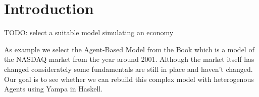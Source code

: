 \section{Introduction}

TODO: select a suitable model simulating an economy 

As example we select the Agent-Based Model from the Book \cite{darley_nasdaq_2007} which is a model of the NASDAQ market from the year around 2001. Although the market itself has changed considerately some fundamentals are still in place and haven't changed. Our goal is to see whether we can rebuild this complex model with heterogenous Agents using Yampa in Haskell. \\